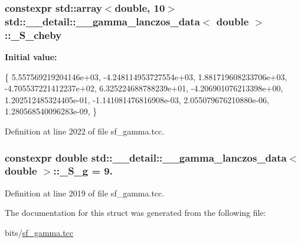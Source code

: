 \subsubsection[{\texorpdfstring{\+\_\+\+S\+\_\+cheby}{_S_cheby}}]{\setlength{\rightskip}{0pt plus 5cm}constexpr std\+::array$<$double, 10$>$ {\bf std\+::\+\_\+\+\_\+detail\+::\+\_\+\+\_\+gamma\+\_\+lanczos\+\_\+data}$<$ double $>$\+::\+\_\+\+S\+\_\+cheby\hspace{0.3cm}{\ttfamily [static]}}\hypertarget{structstd_1_1____detail_1_1____gamma__lanczos__data_3_01double_01_4_a315868c6a789a5e7455f7eb4d8d86115}{}\label{structstd_1_1____detail_1_1____gamma__lanczos__data_3_01double_01_4_a315868c6a789a5e7455f7eb4d8d86115}
{\bfseries Initial value\+:}
\begin{DoxyCode}
\{
     5.557569219204146e+03,
    -4.248114953727554e+03,
     1.881719608233706e+03,
    -4.705537221412237e+02,
     6.325224688788239e+01,
    -4.206901076213398e+00,
     1.202512485324405e-01,
    -1.141081476816908e-03,
     2.055079676210880e-06,
     1.280568540096283e-09,
      \}
\end{DoxyCode}


Definition at line 2022 of file sf\+\_\+gamma.\+tcc.

\subsubsection[{\texorpdfstring{\+\_\+\+S\+\_\+g}{_S_g}}]{\setlength{\rightskip}{0pt plus 5cm}constexpr double {\bf std\+::\+\_\+\+\_\+detail\+::\+\_\+\+\_\+gamma\+\_\+lanczos\+\_\+data}$<$ double $>$\+::\+\_\+\+S\+\_\+g = 9.\hspace{0.3cm}{\ttfamily [static]}}\hypertarget{structstd_1_1____detail_1_1____gamma__lanczos__data_3_01double_01_4_ab7959ed84fcc00db67df8b167165513d}{}\label{structstd_1_1____detail_1_1____gamma__lanczos__data_3_01double_01_4_ab7959ed84fcc00db67df8b167165513d}


Definition at line 2019 of file sf\+\_\+gamma.\+tcc.



The documentation for this struct was generated from the following file\+:\begin{DoxyCompactItemize}
\item 
bits/\hyperlink{sf__gamma_8tcc}{sf\+\_\+gamma.\+tcc}\end{DoxyCompactItemize}
